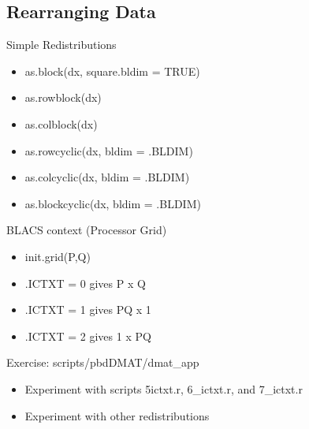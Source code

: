 \subsection{Rearranging Data}
\makesubcontentsslidessec


\begin{frame}
  \begin{block}{Simple Redistributions}\pause
  \begin{itemize}
\item as.block(dx, square.bldim = TRUE)
\item as.rowblock(dx)
\item as.colblock(dx)
\item as.rowcyclic(dx, bldim = .BLDIM)
\item as.colcyclic(dx, bldim = .BLDIM)
\item as.blockcyclic(dx, bldim = .BLDIM)
  \end{itemize}
  \end{block}
  \begin{block}{BLACS context (Processor Grid)}\pause
  \begin{itemize}
\item init.grid(P,Q)
\item .ICTXT = 0 gives P x Q 
\item .ICTXT = 1 gives PQ x 1
\item .ICTXT = 2 gives 1 x PQ
  \end{itemize}
  \end{block}
\end{frame}

\begin{frame}
  \begin{block}{Exercise: scripts/pbdDMAT/dmat\_app}\pause
  \begin{itemize}
  \item Experiment with scripts 5\-ictxt.r, 6\_ictxt.r, and 7\_ictxt.r
  \item Experiment with other redistributions
  \end{itemize}
  \end{block}
\end{frame}

